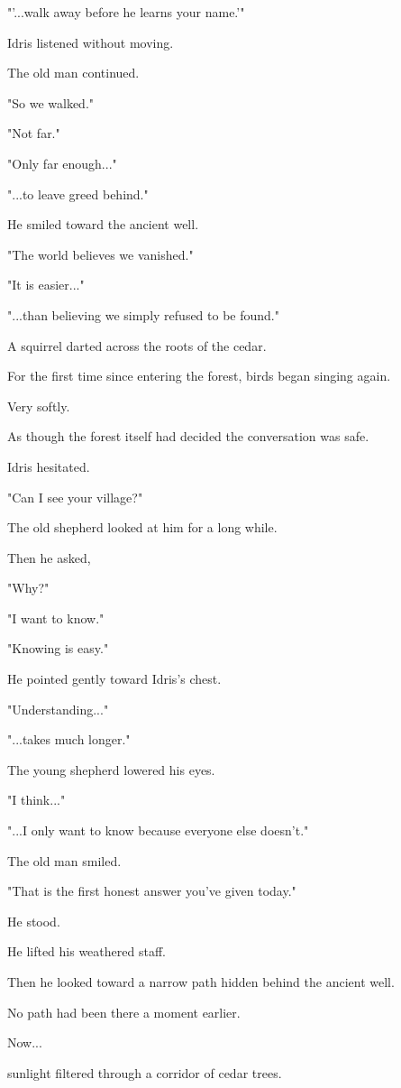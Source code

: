 \documentclass[12pt,openany]{book}
\begin{document}
"'...walk away before he learns your name.'"

Idris listened without moving.

The old man continued.

"So we walked."

"Not far."

"Only far enough..."

"...to leave greed behind."

He smiled toward the ancient well.

"The world believes we vanished."

"It is easier..."

"...than believing we simply refused to be found."

A squirrel darted across the roots of the cedar.

For the first time since entering the forest, birds began singing again.

Very softly.

As though the forest itself had decided the conversation was safe.

Idris hesitated.

"Can I see your village?"

The old shepherd looked at him for a long while.

Then he asked,

"Why?"

"I want to know."

"Knowing is easy."

He pointed gently toward Idris's chest.

"Understanding..."

"...takes much longer."

The young shepherd lowered his eyes.

"I think..."

"...I only want to know because everyone else doesn't."

The old man smiled.

"That is the first honest answer you've given today."

He stood.

He lifted his weathered staff.

Then he looked toward a narrow path hidden behind the ancient well.

No path had been there a moment earlier.

Now...

sunlight filtered through a corridor of cedar trees.
\end{document}
